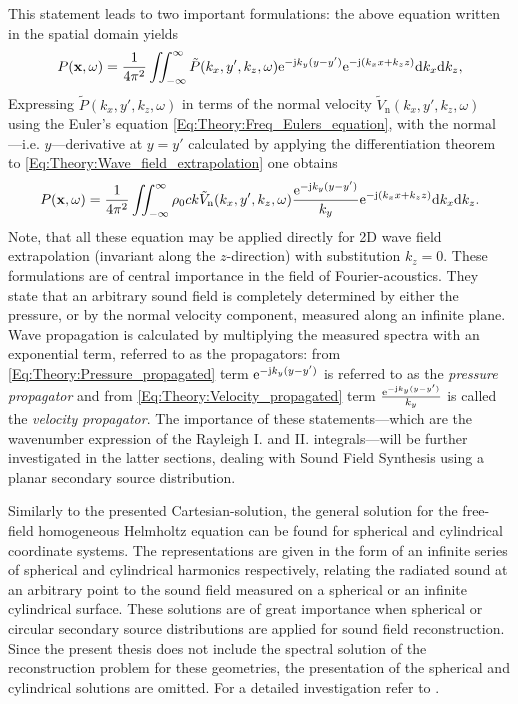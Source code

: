 \vspace{3mm}
This statement leads to two important formulations:
the above equation written in the spatial domain yields
\begin{equation}
P(\mathbf{x},\omega) = \frac{1}{4\pi^2}\iint_{-\infty}^{\infty} \tilde{P}(k_x,y',k_z,\omega) \mathrm{e}^{-\mathrm{j} k_y ( y - y' ) }  \mathrm{e}^{- \mathrm{j} \left( k_x x  + k_z z \right) }
\mathrm{d} k_x\mathrm{d} k_z,
\label{Eq:Theory:Pressure_propagated}
\end{equation}
Expressing $\tilde{P}(k_x,y',k_z,\omega)$ in terms of the normal velocity $\tilde{V}_{\mathrm{n}}(k_x,y',k_z,\omega)$ using the Euler's equation  \eqref{Eq:Theory:Freq_Eulers_equation}, with the normal ---i.e. $y$---derivative at $y = y'$ calculated by applying the differentiation theorem to \eqref{Eq:Theory:Wave_field_extrapolation} one obtains
\begin{equation}
P(\mathbf{x},\omega) = \frac{1}{4\pi^2}\iint_{-\infty}^{\infty} \rho_0 c k \tilde{V}_{\mathrm{n}}(k_x,y',k_z,\omega) \frac{\mathrm{e}^{-\mathrm{j} k_y ( y - y' ) } }{k_y} \mathrm{e}^{- \mathrm{j} \left( k_x x + k_z z \right) }
\mathrm{d} k_x\mathrm{d} k_z.
\label{Eq:Theory:Velocity_propagated}
\end{equation}
Note, that all these equation may be applied directly for 2D wave field extrapolation (invariant along the $z$-direction) with substitution $k_z = 0$.
These formulations are of central importance in the field of Fourier-acoustics. They state that an arbitrary sound field is completely determined by either the pressure, or by the normal velocity component, measured along an infinite plane. Wave propagation is calculated by multiplying the measured spectra with an exponential term, referred to as the propagators: from \eqref{Eq:Theory:Pressure_propagated} term $\mathrm{e}^{-\mathrm{j} k_y ( y - y' ) }$ is referred to as the \emph{pressure propagator} and from \eqref{Eq:Theory:Velocity_propagated} term $\frac{\mathrm{e}^{-\mathrm{j} k_y ( y - y' ) } }{k_y}$ is called the \emph{velocity propagator}.
The importance of these statements---which are the wavenumber expression of the Rayleigh I. and II. integrals---will be further investigated in the latter sections, dealing with Sound Field Synthesis using a planar secondary source distribution.

\vspace{3mm}
Similarly to the presented Cartesian-solution, the general solution for the free-field homogeneous Helmholtz equation can be found for spherical and cylindrical coordinate systems. The representations are given in the form of an infinite series of spherical and cylindrical harmonics respectively, relating the radiated sound at an arbitrary point to the sound field measured on a spherical or an infinite cylindrical surface. These solutions are of great importance when spherical or circular secondary source distributions are applied for sound field reconstruction. Since the present thesis does not include the spectral solution of the reconstruction problem for these geometries, the presentation of the spherical and cylindrical solutions are omitted. For a detailed investigation refer to \cite{Williams1999, Zotter2009phd, Ahrens2012}.

